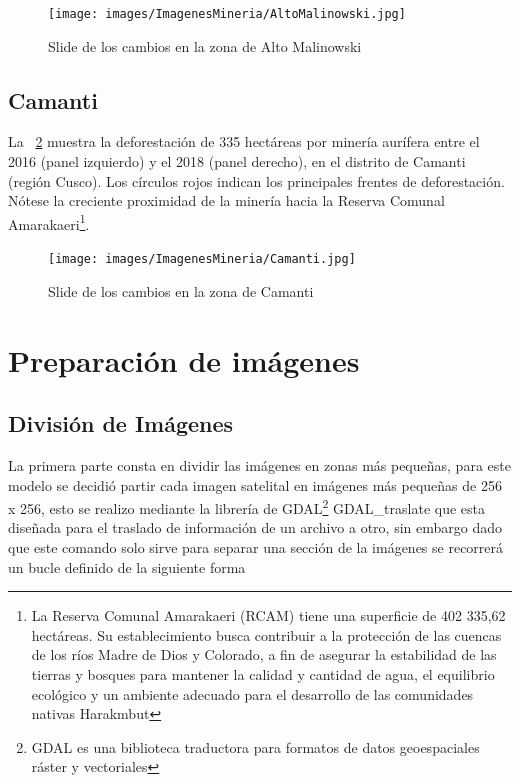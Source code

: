 \begin{figure}[H]
    \centering
    \texttt{[image: images/ImagenesMineria/AltoMalinowski.jpg]}
    \caption{Slide de los cambios en la zona de Alto Malinowski}
    \label{fig:AltoMalinowski}
\end{figure}{}


\subsection{Camanti}




La \figurename~\ref{fig:Camanti}  muestra la deforestación de 335 hectáreas por minería aurífera entre el 2016 (panel izquierdo) y el 2018 (panel derecho), en el distrito de Camanti (región Cusco). Los círculos rojos indican los principales frentes de deforestación. Nótese la creciente proximidad de la minería hacia la Reserva Comunal Amarakaeri\footnote{La Reserva Comunal Amarakaeri (RCAM) tiene una superficie de 402 335,62 hectáreas. Su establecimiento busca contribuir a la protección de las cuencas de los ríos Madre de Dios y Colorado, a fin de asegurar la estabilidad de las tierras y bosques para mantener la calidad y cantidad de agua, el equilibrio ecológico y un ambiente adecuado para el desarrollo de las comunidades nativas Harakmbut}.

\begin{figure}[H]
    \centering
    \texttt{[image: images/ImagenesMineria/Camanti.jpg]}
    \caption{Slide de los cambios en la zona de Camanti}
    \label{fig:Camanti}
\end{figure}{}

\section{Preparación de imágenes}
\subsection{División de Imágenes}
La primera parte consta en dividir las imágenes en zonas más pequeñas, para este modelo se decidió partir cada imagen satelital en imágenes más pequeñas de 256 x 256, esto se realizo mediante la librería de GDAL\footnote{GDAL es una biblioteca traductora para formatos de datos geoespaciales ráster y vectoriales} GDAL\_traslate que esta diseñada para el traslado de información de un archivo a otro, sin embargo dado que este comando solo sirve para separar una sección de la imágenes se recorrerá un bucle definido de la siguiente forma
                 
